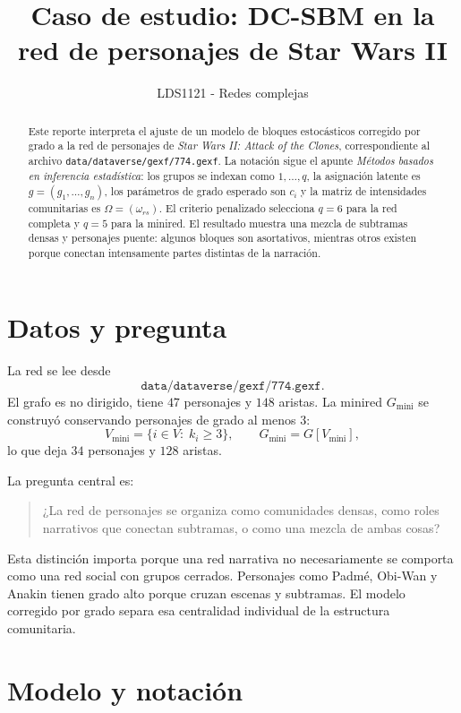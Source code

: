 \documentclass[11pt,letterpaper]{article}
\title{Caso de estudio: DC-SBM en la red de personajes de Star Wars II}
\author{LDS1121 - Redes complejas}
\date{}
\newcommand{\Gmini}{G_{\mathrm{mini}}}
\begin{document}
\maketitle

\begin{abstract}
Este reporte interpreta el ajuste de un modelo de bloques estocásticos corregido por grado a la red de personajes de \emph{Star Wars II: Attack of the Clones}, correspondiente al archivo \texttt{data/dataverse/gexf/774.gexf}. La notación sigue el apunte \emph{Métodos basados en inferencia estadística}: los grupos se indexan como $1,\ldots,q$, la asignación latente es $g=(g_1,\ldots,g_n)$, los parámetros de grado esperado son $c_i$ y la matriz de intensidades comunitarias es $\Omega=(\omega_{rs})$. El criterio penalizado selecciona $q=6$ para la red completa y $q=5$ para la minired. El resultado muestra una mezcla de subtramas densas y personajes puente: algunos bloques son asortativos, mientras otros existen porque conectan intensamente partes distintas de la narración.
\end{abstract}

\section{Datos y pregunta}

La red se lee desde
\[
\texttt{data/dataverse/gexf/774.gexf}.
\]
El grafo es no dirigido, tiene $47$ personajes y $148$ aristas. La minired $\Gmini$ se construyó conservando personajes de grado al menos $3$:
\[
V_{\mathrm{mini}}=\{i\in V:\; k_i\ge 3\},
\qquad
\Gmini=G[V_{\mathrm{mini}}],
\]
lo que deja $34$ personajes y $128$ aristas.

La pregunta central es:

\begin{quote}
¿La red de personajes se organiza como comunidades densas, como roles narrativos que conectan subtramas, o como una mezcla de ambas cosas?
\end{quote}

Esta distinción importa porque una red narrativa no necesariamente se comporta como una red social con grupos cerrados. Personajes como Padmé, Obi-Wan y Anakin tienen grado alto porque cruzan escenas y subtramas. El modelo corregido por grado separa esa centralidad individual de la estructura comunitaria.

\section{Modelo y notación}
\end{document}
